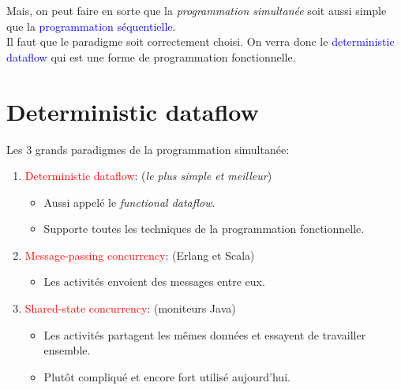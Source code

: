 \documentclass{report}
\begin{document}
Mais, on peut faire en sorte que la \textit{programmation simultanée} soit aussi simple que la \textcolor{blue}{programmation séquentielle}.\\
Il faut que le paradigme soit correctement choisi. On verra donc le \textcolor{blue}{deterministic dataflow} qui est une forme de programmation fonctionnelle.


\section{Deterministic dataflow}
Les 3 grands paradigmes de la programmation simultanée:
\begin{enumerate}
\item \textcolor{red}{Deterministic dataflow}: (\textit{le plus simple et meilleur})
	\begin{itemize}
	\item Aussi appelé le \textit{functional dataflow}.
	\item Supporte toutes les techniques de la programmation fonctionnelle.
	\end{itemize}

\item \textcolor{red}{Message-passing concurrency}: (Erlang et Scala)
	\begin{itemize}
	\item Les activités envoient des messages entre eux.
	\end{itemize}

\item \textcolor{red}{Shared-state concurrency}: (moniteurs Java)
	\begin{itemize}
	\item Les activités partagent les mêmes données et essayent de travailler ensemble.
	\item Plutôt compliqué et encore fort utilisé aujourd'hui.
	\end{itemize}
\end{enumerate}
\end{document}
